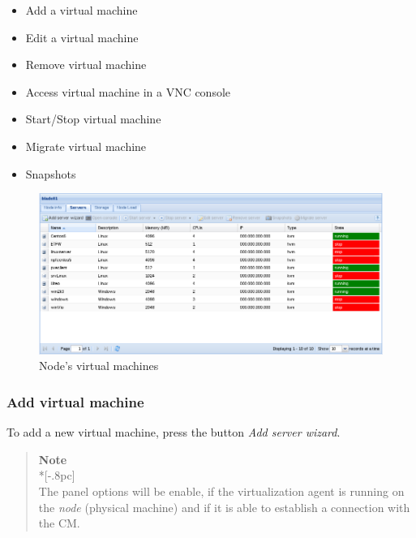 \begin{itemize}
	\item Add a virtual machine
    \item Edit a virtual machine
	\item Remove virtual machine
	\item Access virtual machine in a VNC console
	\item Start/Stop virtual machine
    \item Migrate virtual machine
    \item Snapshots
\end{itemize}
\begin{figure}[H]
	\begin{center}
	\includegraphics[scale=0.45]{screenshots/node_servers.png}
	\caption{Node's virtual machines}
	\label{fig:node_servers}
	\end{center}
\end{figure}

\subsubsection{Add virtual machine}
\label{sec:add_server}

To add a new virtual machine, press the button \emph{Add server wizard}.
\begin{quote}
	{\large \bf Note} \\*[-.8pc]
	\underline{\hspace{6in}} \\
    The panel options will be enable, if the virtualization agent is running on the \emph{node} (physical machine) and if it is able to establish a connection with the CM.
\end{quote}
 

